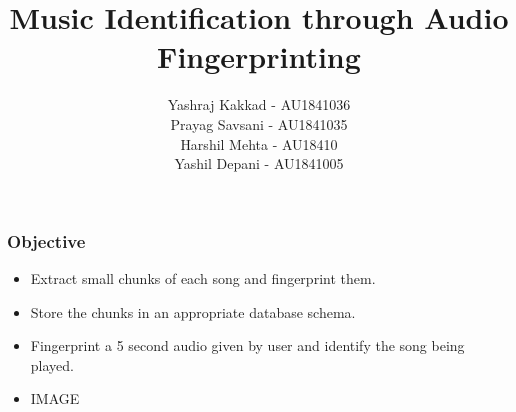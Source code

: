 \documentclass{beamer}
\author{Yashraj Kakkad - AU1841036 \\
        Prayag Savsani - AU1841035 \\
        Harshil Mehta - AU18410 \\
        Yashil Depani - AU1841005}
\title{Music Identification through Audio Fingerprinting}
\begin{document}
\maketitle

\begin{frame}[t] %
\frametitle{Objective}
\begin{itemize}
    \item Extract small chunks of each song and fingerprint them.
    \item Store the chunks in an appropriate database schema. 
    \item Fingerprint a 5 second audio given by user and identify the song being played.
    \item IMAGE
\end{itemize}
\end{frame}
\end{document}
